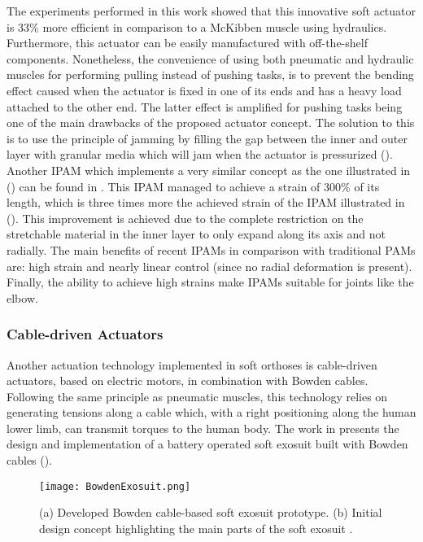 The experiments performed in this work showed that this innovative soft actuator is 33\% more efficient in comparison to a McKibben muscle using hydraulics. Furthermore, this actuator can be easily manufactured with off-the-shelf components. Nonetheless, the convenience of using both pneumatic and hydraulic muscles for performing pulling instead of pushing tasks, is to prevent the bending effect caused when the actuator is fixed in one of its ends and has a heavy load attached to the other end. The latter effect is amplified for pushing tasks being one of the main drawbacks of the proposed actuator concept. The solution to this is to use the principle of jamming by filling the gap between the inner and outer layer with granular media which will jam when the actuator is pressurized (). Another IPAM which implements a very similar concept as the one illustrated in () can be found in \cite{Hawkes2016}. This IPAM managed to achieve a strain of 300\% of its length, which is three times more the achieved strain of the IPAM illustrated in (). This improvement is achieved due to the complete restriction on the stretchable material in the inner layer to only expand along its axis and not radially. The main benefits of recent IPAMs in comparison with traditional PAMs are: high strain and nearly linear control (since no radial deformation is present). Finally, the ability to achieve high strains make IPAMs suitable for joints like the elbow.

\subsubsection{Cable-driven Actuators} \label{sec:cable-driven}

Another actuation technology implemented in soft orthoses is cable-driven actuators, based on electric motors, in combination with Bowden cables. Following the same principle as pneumatic muscles, this technology relies on generating tensions along a cable which, with a right positioning along the human lower limb, can transmit torques to the human body. The work in \cite{asbeck2013biologically} presents the design and implementation of a battery operated soft exosuit built with Bowden cables (). 
\begin{figure}[hbtp!]
    \centering
    \texttt{[image: BowdenExosuit.png]}
    \caption[(a) Developed Bowden cable-based soft exosuit prototype. (b) Initial design concept highlighting the main parts of the soft exosuit.]{(a) Developed Bowden cable-based soft exosuit prototype. (b) Initial design concept highlighting the main parts of the soft exosuit \cite{asbeck2013biologically}. }
    \label{fig:bowden_exo}
\end{figure}

